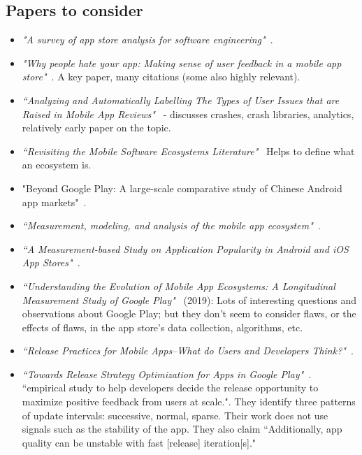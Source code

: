 \subsection{Papers to consider}
\begin{itemize}
    \item \emph{"A survey of app store analysis for software engineering"}~\cite{martin2016survey}.
    
    \item \emph{"Why people hate your app: Making sense of user feedback in a mobile app store"}~\cite{fu2013people}. A key paper, many citations (some also highly relevant).
    
    \item \emph{``Analyzing and Automatically Labelling The Types of User Issues that are Raised in Mobile App Reviews"}~\cite{mcilroy2016analyzing} - discusses crashes, crash libraries, analytics, relatively early paper on the topic.
    
    \item \emph{``Revisiting the Mobile Software Ecosystems Literature"}~\cite{steglich2019revisiting} Helps to define what an ecosystem is.
    
    \item "Beyond Google Play: A large-scale comparative study of Chinese Android app markets"~\cite{wang2018_beyond_google_play}.
    
    \item \emph{``Measurement, modeling, and analysis of the mobile app ecosystem"}~\cite{petsas2017measurement}.
    
    \item \emph{``A Measurement-based Study on Application Popularity in Android and iOS App Stores"}~\cite{liu2015measurement}.
    
    \item \emph{``Understanding the Evolution of Mobile App Ecosystems: A Longitudinal Measurement Study of Google Play"}~\cite{wang2019understanding} (2019): Lots of interesting questions and observations about Google Play; but they don't seem to consider flaws, or the effects of flaws, in the app store's data collection, algorithms, etc.
    
    \item \emph{``Release Practices for Mobile Apps--What do Users and Developers Think?"}~\cite{nayebi2016release}.
    
    \item \emph{``Towards Release Strategy Optimization for Apps in Google Play"}~\citep{shen2017_towards_release_strategy_optimization_for_apps_in_google_play}. ``empirical study to help developers decide the release opportunity to maximize positive feedback from users at scale.". They identify three patterns of update intervals: successive, normal, sparse. Their work does not use signals such as the stability of the app. They also claim ``Additionally, app quality can be unstable with fast [release] iteration[s]."
    

\end{itemize}
